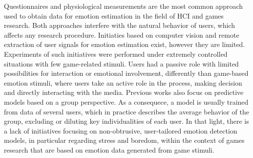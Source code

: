 Questionnaires and physiological measurements are the most common approach used to obtain data for emotion estimation in the field of HCI and games research. Both approaches interfere with the natural behavior of users, which affects any research procedure. Initiaties based on computer vision and remote extraction of user signals for emotion estimation exist, however they are limited. Experiments of such initiatives were performed under extremely controlled situations with few game-related stimuli. Users had a passive role with limited possibilities for interaction or emotional involvement, differently than game-based emotion stimuli, where users take an active role in the process, making decision and directly interacting with the media. Previous works also focus on predictive models based on a group perspective. As a consequece, a model is usually trained from data of several users, which in practice describes the average behavior of the group, excluding or diluting key individualities of each user. In that light, there is a lack of initiatives focusing on non-obtrusive, user-tailored emotion detection models, in particular regarding stress and boredom, within the context of games research that are based on emotion data generated from game stimuli.

